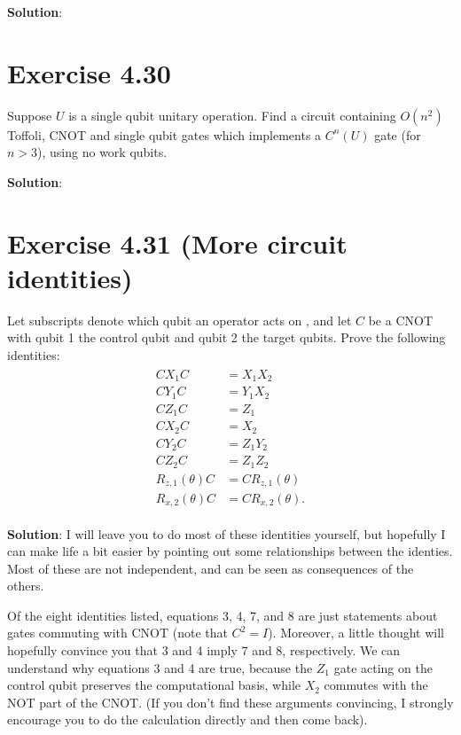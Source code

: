 \documentclass{book}
\begin{document}
    \textbf{Solution}:

\section*{Exercise 4.30}
    Suppose $U$ is a single qubit unitary operation. Find a circuit containing $O(n^2)$ Toffoli, CNOT and single qubit gates which implements a $C^n(U)$ gate (for $n>3$), using no work qubits.

    \textbf{Solution}:

\section*{Exercise 4.31 (More circuit identities)}
    Let subscripts denote which qubit an operator acts on , and let $C$ be a CNOT with qubit 1 the control qubit and qubit 2 the target qubits. Prove the following identities:
    \begin{align}
    \begin{aligned}
        C X_1 C &= X_1 X_2 \\
        C Y_1 C &= Y_1 X_2 \\
        C Z_1 C &= Z_1 \\
        C X_2 C &= X_2 \\
        C Y_2 C &= Z_1 Y_2 \\
        C Z_2 C &= Z_1 Z_2 \\
        R_{z,1}(\theta) C &= C R_{z,1}(\theta)  \\
        R_{x,2}(\theta) C &= C R_{x,2}(\theta).      
    \end{aligned}
    \end{align}

    \textbf{Solution}: I will leave you to do most of these identities yourself, but hopefully I can make life a bit easier by pointing out some relationships between the identies. Most of these are not independent, and can be seen as consequences of the others.

    Of the eight identities listed, equations 3, 4, 7, and 8 are just statements about gates commuting with CNOT (note that $C^2 = I$). Moreover, a little thought will hopefully convince you that 3 and 4 imply 7 and 8, respectively. We can understand why equations 3 and 4 are true, because the $Z_1$ gate acting on the control qubit preserves the computational basis, while $X_2$ commutes with the NOT part of the CNOT. (If you don't find these arguments convincing, I strongly encourage you to do the calculation directly and then come back).
\end{document}
